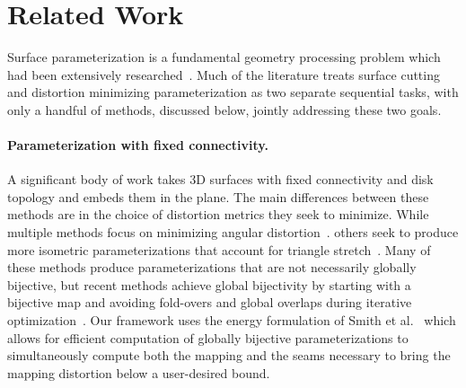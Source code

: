 
\section{Related Work}
\label{sec:related}
Surface parameterization is a fundamental geometry processing problem which had been extensively researched~\cite{Sheffer07_ParameterizationSurvey,Hormann2008}.
Much of the literature treats  surface cutting and distortion minimizing parameterization as two separate sequential tasks, with only a handful of methods, discussed below, jointly addressing these two goals.

\paragraph{Parameterization with fixed connectivity.}
A significant body of work takes 3D surfaces with fixed connectivity and disk topology and embeds them in the plane.  The main differences between these methods are in the choice of distortion metrics they seek to minimize.  While multiple methods focus on minimizing angular distortion~\cite{Floater2003,Sheffer2005ABFPP,Levy2002,Aigerman2015,Sawhney:2017}. 
others seek to produce more isometric parameterizations that account for triangle stretch~\cite{Sander2001Texture,Hormann2000MIPS,Rabinovich2017,Zhu2017BCQN,Shtengel:GOvCM:2017,claici2017isometry}. Many of these methods produce parameterizations that are not necessarily globally bijective, but recent methods achieve global bijectivity by starting with a bijective map and avoiding fold-overs and global overlaps during iterative optimization~\cite{Smith2015Bijective,Jiang2017Simplicial}.
Our framework uses the energy formulation of Smith et al.~ which allows for efficient computation of globally bijective parameterizations to simultaneously compute both the mapping and the seams necessary to bring the mapping distortion below a user-desired bound.   
%

